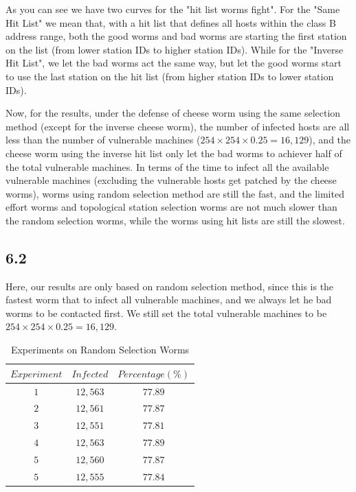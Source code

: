 \documentclass[10pt]{article}
\begin{document}
As you can see we have two curves for the "hit list worms fight". For the "Same Hit List" we mean that, with a hit list that defines all hosts within the class B address range, both the good worms and bad worms are starting the first station on the list (from lower station IDs to higher station IDs). While for the "Inverse Hit List", we let the bad worms act the same way, but let the good worms start to use the last station on the hit list (from higher station IDs to lower station IDs). 

Now, for the results, under the defense of cheese worm using the same selection method (except for the inverse cheese worm), the number of infected hosts are all less than the number of vulnerable machines ($254\times254\times0.25 = 16,129$), and the cheese worm using the inverse hit list only let the bad worms to achiever half of the total vulnerable machines. In terms of the time to infect all the available vulnerable machines (excluding the vulnerable hosts get patched by the cheese worms), worms using random selection method are still the fast, and the limited effort worms and topological station selection worms are not much slower than the random selection worms, while the worms using hit lists are still the slowest. 


\subsection*{6.2}

Here, our results are only based on random selection method, since this is the fastest worm that to infect all vulnerable machines, and we always let he bad worms to be contacted first. We still set the total vulnerable machines to be $254\times254\times0.25 =16,129$. 

\begin{table}[H]
\begin{center}
\begin{tabular}{| c || c | c | }
  \hline
$ Experiment $&$ Infected $&$Percentage(\%)$ 
\\  \hline
$1$&$ 12,563 $&$ 77.89  $
\\  \hline
$2$&$ 12,561 $&$ 77.87  $
\\  \hline
$3$&$ 12,551 $&$ 77.81  $
\\  \hline
$4$&$ 12,563 $&$ 77.89  $
\\  \hline
$5$&$ 12,560 $&$ 77.87  $
\\  \hline
$5$&$ 12,555 $&$ 77.84  $
\\  \hline
\end{tabular}
\end{center}
\caption{Experiments on Random Selection Worms}
\end{table}
\end{document}
